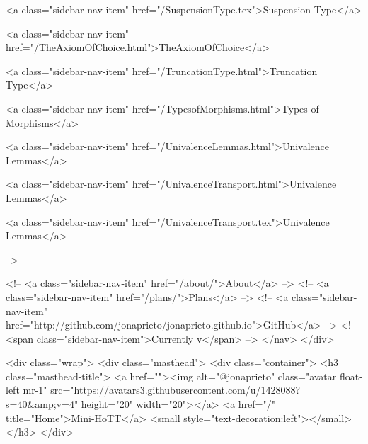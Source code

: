       
    
      
        
          <a class="sidebar-nav-item" href="/SuspensionType.tex">Suspension Type</a>
        
      
    
      
        
          <a class="sidebar-nav-item" href="/TheAxiomOfChoice.html">TheAxiomOfChoice</a>
        
      
    
      
        
          <a class="sidebar-nav-item" href="/TruncationType.html">Truncation Type</a>
        
      
    
      
        
          <a class="sidebar-nav-item" href="/TypesofMorphisms.html">Types of Morphisms</a>
        
      
    
      
        
          <a class="sidebar-nav-item" href="/UnivalenceLemmas.html">Univalence Lemmas</a>
        
      
    
      
        
          <a class="sidebar-nav-item" href="/UnivalenceTransport.html">Univalence Lemmas</a>
        
      
    
      
        
          <a class="sidebar-nav-item" href="/UnivalenceTransport.tex">Univalence Lemmas</a>
        
      
     -->

    <!-- <a class="sidebar-nav-item" href="/about/">About</a> -->
    <!-- <a class="sidebar-nav-item" href="/plans/">Plans</a> -->
    <!-- <a class="sidebar-nav-item" href="http://github.com/jonaprieto/jonaprieto.github.io">GitHub</a> -->
    <!-- <span class="sidebar-nav-item">Currently v</span> -->
  </nav>
</div>

    <div class="wrap">
      <div class="masthead">
        <div class="container">
          <h3 class="masthead-title">
            <a href=""><img alt="@jonaprieto" class="avatar float-left mr-1" src="https://avatars3.githubusercontent.com/u/1428088?s=40&amp;v=4" height="20" width="20"></a>
            <a href="/" title="Home">Mini-HoTT</a>
            <small style="text-decoration:left"></small>
          </h3>
        </div>
      
